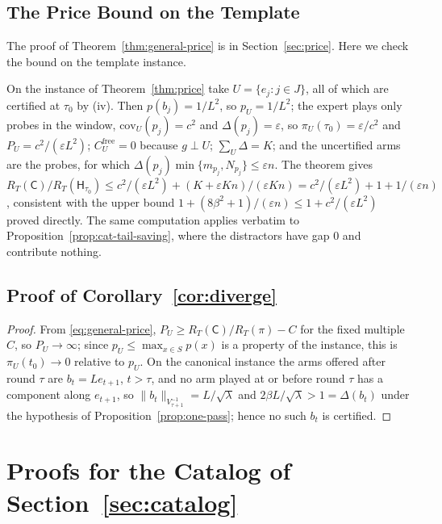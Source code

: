 \documentclass{article}
\theoremstyle{definition}
\theoremstyle{remark}
\newcommand{\eps}{\varepsilon}
\theoremstyle{remark}
\newcommand{\Cold}{\mathsf{C}}
\newcommand{\Hyb}{\mathsf{H}}
\begin{document}
\subsection{The Price Bound on the Template}
\label{app:price-template}

The proof of Theorem~\ref{thm:general-price} is in Section~\ref{sec:price}.
Here we check the bound on the template instance.

On the instance of Theorem~\ref{thm:price} take $U=\{e_j:j\in J\}$, all of
which are certified at $\tau_0$ by (iv). Then $p(b_j)=1/L^2$, so $p_U=1/L^2$;
the expert plays only probes in the window, $\mathrm{cov}_U(p_j)=c^2$ and
$\Delta(p_j)=\eps$, so $\pi_U(\tau_0)=\eps/c^2$ and $P_U=c^2/(\eps L^2)$;
$C^{\mathrm{free}}_U=0$ because $g\perp U$; $\sum_U\Delta=K$; and the
uncertified arms are the probes, for which
$\Delta(p_j)\min\{m_{p_j},N_{p_j}\}\le\eps n$. The theorem gives
$R_T(\Cold)/R_T(\Hyb_{\tau_0})\le c^2/(\eps L^2)+(K+\eps Kn)/(\eps Kn)=c^2/(\eps L^2)+1+1/(\eps n)$,
consistent with the upper bound $1+(8\beta^2+1)/(\eps n)\le1+c^2/(\eps L^2)$
proved directly. The same computation applies verbatim to
Proposition~\ref{prop:cat-tail-saving}, where the distractors have gap $0$
and contribute nothing.

\subsection{Proof of Corollary~\ref{cor:diverge}}
\label{app:proof-diverge}

\begin{proof}
From \eqref{eq:general-price}, $P_U\ge R_T(\Cold)/R_T(\pi)-C$ for the
fixed multiple $C$, so $P_U\to\infty$; since $p_U\le\max_{x\in S}p(x)$ is a
property of the instance, this is $\pi_U(t_0)\to0$ relative to $p_U$.
On the canonical instance the arms offered after round $\tau$ are
$b_t=Le_{t+1}$, $t>\tau$, and no arm played at or before round $\tau$ has a
component along $e_{t+1}$, so $\|b_t\|_{V_{\tau+1}^{-1}}=L/\sqrt\lambda$ and
$2\beta L/\sqrt\lambda>1=\Delta(b_t)$ under the hypothesis of
Proposition~\ref{prop:one-pass}; hence no such $b_t$ is certified.
\end{proof}

\section{Proofs for the Catalog of Section~\ref{sec:catalog}}
\label{app:catalog}
\end{document}
